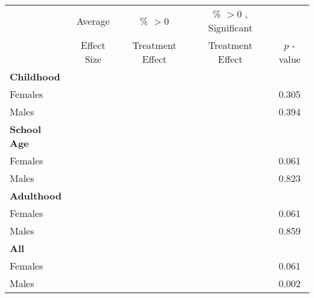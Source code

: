 \begin{tabular}{l c c c c}
\toprule
 & Average & \% $ >0 $ & \% $ >0 $ , Significant & \citet{Rosenbaum_2005_Distribution_JRSS} \\
 & Effect Size & Treatment Effect & Treatment Effect & $ p $ -value \\
\midrule
\textbf{Childhood} & & & & \\
\quad Females &   &  &  &     0.305 \\
\quad Males &   &  &  &     0.394 \\
\midrule
\textbf{School Age} & & & & \\
\quad Females &   &  &  &     0.061 \\
\quad Males &   &  &  &     0.823 \\
\midrule
\textbf{Adulthood} & & & & \\
\quad Females &   &  &  &     0.061 \\
\quad Males &   &  &  &     0.859 \\
\midrule
\textbf{All} & & & & \\
\quad Females &   &  &  &     0.061 \\
\quad Males &   &  &  &     0.002 \\
\bottomrule
\end{tabular}
